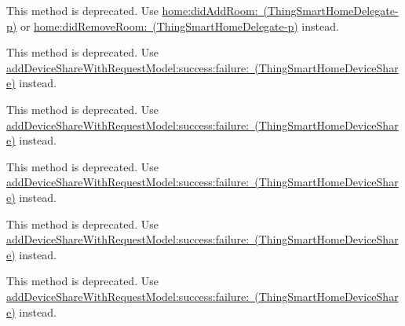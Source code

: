 \begin{DoxyRefList}
\label{deprecated__deprecated000055}%
%
This method is deprecated. Use \mbox{\hyperlink{protocol_thing_smart_home_delegate-p_acbc50744a6be25877aa0cdccb4ebb424}{home\+:did\+Add\+Room\+: (\+Thing\+Smart\+Home\+Delegate-\/p)}} or \mbox{\hyperlink{protocol_thing_smart_home_delegate-p_a1fa4b13b903fa588e8386cb9d96196fc}{home\+:did\+Remove\+Room\+: (\+Thing\+Smart\+Home\+Delegate-\/p)}} instead.  
\item[(Thing\+Deprecated\+Api) Member \mbox{\hyperlink{category_thing_smart_home_device_share_07_thing_deprecated_api_08_a629208e05ed93b013e796c45d0698cc2}{\mbox{[}Thing\+Smart\+Home\+Device\+Share(Thing\+Deprecated\+Api) add\+Device\+Share\+With\+Home\+Id\+:country\+Code\+:user\+Account\+:dev\+Id\+:success\+:failure\+:\mbox{]}}} ]\label{deprecated__deprecated000036}%
%
This method is deprecated. Use \mbox{\hyperlink{interface_thing_smart_home_device_share_afbebb1c8fe1f3a71b4b476c1e1dd62ac}{add\+Device\+Share\+With\+Request\+Model\+:success\+:failure\+: (\+Thing\+Smart\+Home\+Device\+Share)}} instead. 

\label{deprecated__deprecated000072}%
%
This method is deprecated. Use \mbox{\hyperlink{interface_thing_smart_home_device_share_afbebb1c8fe1f3a71b4b476c1e1dd62ac}{add\+Device\+Share\+With\+Request\+Model\+:success\+:failure\+: (\+Thing\+Smart\+Home\+Device\+Share)}} instead. 

\label{deprecated__deprecated000018}%
%
This method is deprecated. Use \mbox{\hyperlink{interface_thing_smart_home_device_share_afbebb1c8fe1f3a71b4b476c1e1dd62ac}{add\+Device\+Share\+With\+Request\+Model\+:success\+:failure\+: (\+Thing\+Smart\+Home\+Device\+Share)}} instead. 

\label{deprecated__deprecated000054}%
%
This method is deprecated. Use \mbox{\hyperlink{interface_thing_smart_home_device_share_afbebb1c8fe1f3a71b4b476c1e1dd62ac}{add\+Device\+Share\+With\+Request\+Model\+:success\+:failure\+: (\+Thing\+Smart\+Home\+Device\+Share)}} instead.  
\item[(Thing\+Deprecated\+Api) Member \mbox{\hyperlink{category_thing_smart_home_device_share_07_thing_deprecated_api_08_af7ad246709476ac1b09647437a3521bf}{\mbox{[}Thing\+Smart\+Home\+Device\+Share(Thing\+Deprecated\+Api) add\+Share\+With\+Home\+Id\+:country\+Code\+:user\+Account\+:dev\+Ids\+:success\+:failure\+:\mbox{]}}} ]\label{deprecated__deprecated000053}%
%
This method is deprecated. Use \mbox{\hyperlink{interface_thing_smart_home_device_share_afbebb1c8fe1f3a71b4b476c1e1dd62ac}{add\+Device\+Share\+With\+Request\+Model\+:success\+:failure\+: (\+Thing\+Smart\+Home\+Device\+Share)}} instead. 


\end{DoxyRefList}
